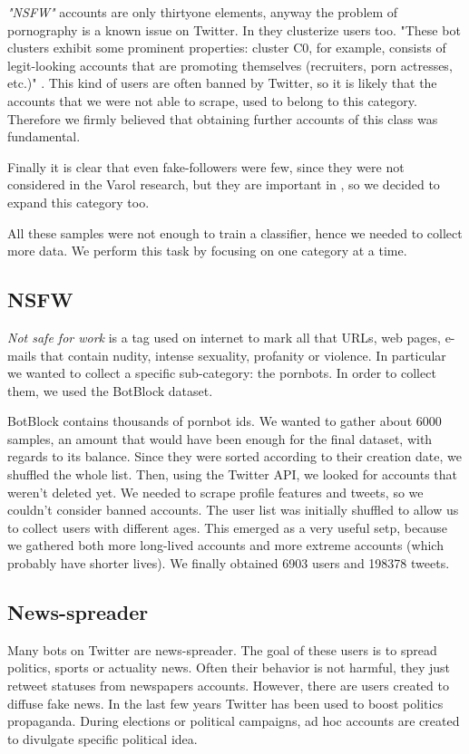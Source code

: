 \emph{"NSFW"} accounts are only thirtyone elements, anyway the problem of pornography is a known issue on Twitter. In \cite{Varol} they clusterize users too. "These bot clusters exhibit some prominent properties: cluster C0, for example, consists of legit-looking accounts that are promoting themselves (recruiters, porn actresses, etc.)" \cite{Varol}.
This kind of users are often banned by Twitter, so it is likely that the accounts that we were not able to scrape, used to belong to this category.
Therefore we firmly believed that obtaining further accounts of this class was fundamental.

Finally it is clear that even fake-followers were few, since they were not considered in the Varol research, but they are important in \cite{Cresci}, so we decided to expand this category too.

All these samples were not enough to train a classifier, hence we needed to collect more data. We perform this task by focusing on one category at a time.

\subsection{NSFW}
\emph{Not safe for work} is a tag used on internet to mark all that URLs, web pages, e-mails that contain nudity, intense sexuality, profanity or violence. In particular we wanted to collect a specific sub-category: the pornbots. In order to collect them, we used the BotBlock dataset.

BotBlock contains thousands of pornbot ids. We wanted to gather about 6000 samples, an amount that would have been enough for the final dataset, with regards to its balance.
Since they were sorted according to their creation date, we shuffled the whole list. Then, using the Twitter API, we looked for accounts that weren't deleted yet. 
We needed to scrape profile features and tweets, so we couldn't consider banned accounts. The user list was initially shuffled to allow us to collect users with different ages. This emerged as a very useful setp, because we gathered both more long-lived accounts and more extreme accounts (which probably have shorter lives). We finally obtained 6903 users and 198378 tweets.
\subsection{News-spreader}
Many bots on Twitter are news-spreader. The goal of these users is to spread politics, sports or actuality news. Often their behavior is not harmful, they just retweet statuses from newspapers accounts. However, there are users created to diffuse fake news. In the last few years Twitter has been used to boost politics propaganda. During elections or political campaigns, ad hoc accounts are created to divulgate specific political idea.

